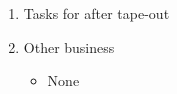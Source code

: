 \documentclass{article}
\begin{document}
\begin{flushleft}
\begin{enumerate}

  \item Tasks for after tape-out 
    \begin{itemize}
    \end{itemize}
  
  \item Other business
    \begin{itemize}
      \item None
    \end{itemize}
\end{enumerate}

\end{flushleft}
\end{document}
